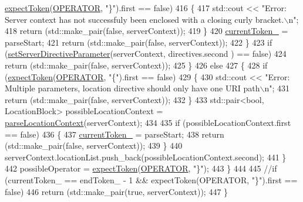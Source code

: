 \begin{DoxyCode}
      \hyperlink{classft_1_1_parser_a1615a752d3642bb53598e2c8db810db0}{expectToken}(\hyperlink{namespaceft_aa520fbf142ba1e7e659590c07da31921a6411d9d6073252e4d316493506bbb979}{OPERATOR}, \textcolor{stringliteral}{"\}"}).first == \textcolor{keyword}{false})
416                     \{
417                         std::cout << \textcolor{stringliteral}{"Error: Server context has not successfuly been enclosed with a
       closing curly bracket.\(\backslash\)n"};
418                         \textcolor{keywordflow}{return} (std::make\_pair(\textcolor{keyword}{false}, serverContext));
419                     \}
420                     \hyperlink{classft_1_1_parser_a942c5b794d108f144c5b5028aaa34cb6}{currentToken\_} = parseStart;
421                     \textcolor{keywordflow}{return} (std::make\_pair(\textcolor{keyword}{false}, serverContext));
422                 \}
423                 \textcolor{keywordflow}{if} (\hyperlink{classft_1_1_parser_a18c1b12280ce1a16246a8ba09156116f}{setServerDirectiveParameter}(serverContext, directives.second
      ) == \textcolor{keyword}{false})
424                     \textcolor{keywordflow}{return} (std::make\_pair(\textcolor{keyword}{false}, serverContext));
425             \}
426             \textcolor{keywordflow}{else}
427             \{
428                 \textcolor{keywordflow}{if} (\hyperlink{classft_1_1_parser_a1615a752d3642bb53598e2c8db810db0}{expectToken}(\hyperlink{namespaceft_aa520fbf142ba1e7e659590c07da31921a6411d9d6073252e4d316493506bbb979}{OPERATOR}, \textcolor{stringliteral}{"\{"}).first == \textcolor{keyword}{false})
429                 \{
430                     std::cout << \textcolor{stringliteral}{"Error: Multiple parameters, location directive should only have one URI
       path\(\backslash\)n"};
431                     \textcolor{keywordflow}{return} (std::make\_pair(\textcolor{keyword}{false}, serverContext));
432                 \}
433                 std::pair<bool, LocationBlock>  possibleLocationContext = 
      \hyperlink{classft_1_1_parser_a87f0f31d2bc2e6357d522e70256878ca}{parseLocationContext}(serverContext);
434                         
435                 \textcolor{keywordflow}{if} (possibleLocationContext.first == \textcolor{keyword}{false})
436                 \{
437                     \hyperlink{classft_1_1_parser_a942c5b794d108f144c5b5028aaa34cb6}{currentToken\_} = parseStart;
438                     \textcolor{keywordflow}{return} (std::make\_pair(\textcolor{keyword}{false}, serverContext));
439                 \}
440                 serverContext.locationList.push\_back(possibleLocationContext.second);
441             \}
442             possibleOperator = \hyperlink{classft_1_1_parser_a1615a752d3642bb53598e2c8db810db0}{expectToken}(\hyperlink{namespaceft_aa520fbf142ba1e7e659590c07da31921a6411d9d6073252e4d316493506bbb979}{OPERATOR}, \textcolor{stringliteral}{"\}"});
443         \}
444 
445         \textcolor{comment}{//if (currentToken\_ == endToken\_ - 1 && expectToken(OPERATOR, "\}").first == false)}
446         \textcolor{keywordflow}{return} (std::make\_pair(\textcolor{keyword}{true}, serverContext));
447     \}
\end{DoxyCode}
